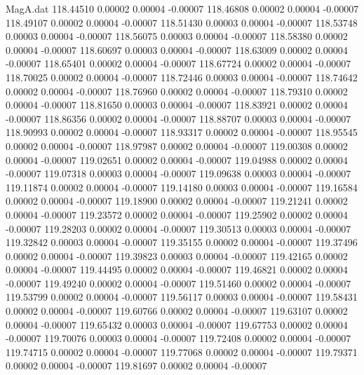 \begin{filecontents}{MagA.dat}
 118.44510    0.00002    0.00004   -0.00007
 118.46808    0.00002    0.00004   -0.00007
 118.49107    0.00002    0.00004   -0.00007
 118.51430    0.00003    0.00004   -0.00007
 118.53748    0.00003    0.00004   -0.00007
 118.56075    0.00003    0.00004   -0.00007
 118.58380    0.00002    0.00004   -0.00007
 118.60697    0.00003    0.00004   -0.00007
 118.63009    0.00002    0.00004   -0.00007
 118.65401    0.00002    0.00004   -0.00007
 118.67724    0.00002    0.00004   -0.00007
 118.70025    0.00002    0.00004   -0.00007
 118.72446    0.00003    0.00004   -0.00007
 118.74642    0.00002    0.00004   -0.00007
 118.76960    0.00002    0.00004   -0.00007
 118.79310    0.00002    0.00004   -0.00007
 118.81650    0.00003    0.00004   -0.00007
 118.83921    0.00002    0.00004   -0.00007
 118.86356    0.00002    0.00004   -0.00007
 118.88707    0.00003    0.00004   -0.00007
 118.90993    0.00002    0.00004   -0.00007
 118.93317    0.00002    0.00004   -0.00007
 118.95545    0.00002    0.00004   -0.00007
 118.97987    0.00002    0.00004   -0.00007
 119.00308    0.00002    0.00004   -0.00007
 119.02651    0.00002    0.00004   -0.00007
 119.04988    0.00002    0.00004   -0.00007
 119.07318    0.00003    0.00004   -0.00007
 119.09638    0.00003    0.00004   -0.00007
 119.11874    0.00002    0.00004   -0.00007
 119.14180    0.00003    0.00004   -0.00007
 119.16584    0.00002    0.00004   -0.00007
 119.18900    0.00002    0.00004   -0.00007
 119.21241    0.00002    0.00004   -0.00007
 119.23572    0.00002    0.00004   -0.00007
 119.25902    0.00002    0.00004   -0.00007
 119.28203    0.00002    0.00004   -0.00007
 119.30513    0.00003    0.00004   -0.00007
 119.32842    0.00003    0.00004   -0.00007
 119.35155    0.00002    0.00004   -0.00007
 119.37496    0.00002    0.00004   -0.00007
 119.39823    0.00003    0.00004   -0.00007
 119.42165    0.00002    0.00004   -0.00007
 119.44495    0.00002    0.00004   -0.00007
 119.46821    0.00002    0.00004   -0.00007
 119.49240    0.00002    0.00004   -0.00007
 119.51460    0.00002    0.00004   -0.00007
 119.53799    0.00002    0.00004   -0.00007
 119.56117    0.00003    0.00004   -0.00007
 119.58431    0.00002    0.00004   -0.00007
 119.60766    0.00002    0.00004   -0.00007
 119.63107    0.00002    0.00004   -0.00007
 119.65432    0.00003    0.00004   -0.00007
 119.67753    0.00002    0.00004   -0.00007
 119.70076    0.00003    0.00004   -0.00007
 119.72408    0.00002    0.00004   -0.00007
 119.74715    0.00002    0.00004   -0.00007
 119.77068    0.00002    0.00004   -0.00007
 119.79371    0.00002    0.00004   -0.00007
 119.81697    0.00002    0.00004   -0.00007

\end{filecontents}
